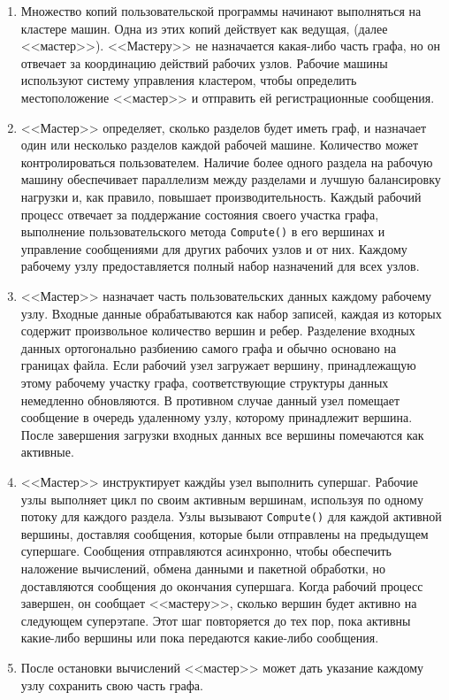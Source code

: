 \begin{enumerate}
  \item Множество копий пользовательской программы начинают выполняться на кластере машин. 
    Одна из этих копий действует как ведущая, (далее <<мастер>>). 
    <<Мастеру>> не назначается какая-либо часть графа, но он отвечает за координацию действий рабочих узлов.
    Рабочие машины используют систему управления кластером, чтобы определить местоположение <<мастер>> и отправить ей регистрационные сообщения.
  \item <<Мастер>> определяет, сколько разделов будет иметь граф, и назначает один или несколько разделов каждой рабочей машине. 
    Количество может контролироваться пользователем. 
    Наличие более одного раздела на рабочую машину обеспечивает параллелизм между разделами и лучшую балансировку нагрузки и, как правило, повышает производительность. 
    Каждый рабочий процесс отвечает за поддержание состояния своего участка графа, выполнение пользовательского метода \texttt{Compute()} в его вершинах и управление сообщениями для других рабочих узлов и от них. 
    Каждому рабочему узлу предоставляется полный набор назначений для всех узлов.
  \item <<Мастер>> назначает часть пользовательских данных каждому рабочему узлу. 
    Входные данные обрабатываются как набор записей, каждая из которых содержит произвольное количество вершин и ребер. 
    Разделение входных данных ортогонально разбиению самого графа и обычно основано на границах файла. 
    Если рабочий узел загружает вершину, принадлежащую этому рабочему участку графа, соответствующие структуры данных немедленно обновляются. 
    В противном случае данный узел помещает сообщение в очередь удаленному узлу, которому принадлежит вершина. 
    После завершения загрузки входных данных все вершины помечаются как активные.
  \item <<Мастер>> инструктирует каждйы узел выполнить супершаг. 
    Рабочие узлы выполняет цикл по своим активным вершинам, используя по одному потоку для каждого раздела. 
    Узлы вызывают \texttt{Compute()} для каждой активной вершины, доставляя сообщения, которые были отправлены на предыдущем супершаге. 
    Сообщения отправляются асинхронно, чтобы обеспечить наложение вычислений, обмена данными и пакетной обработки, но доставляются сообщения до окончания супершага.
    Когда рабочий процесс завершен, он сообщает <<мастеру>>, сколько вершин будет активно на следующем суперэтапе. 
    Этот шаг повторяется до тех пор, пока активны какие-либо вершины или пока передаются какие-либо сообщения.
  \item После остановки вычислений <<мастер>> может дать указание каждому узлу сохранить свою часть графа.
\end{enumerate}

